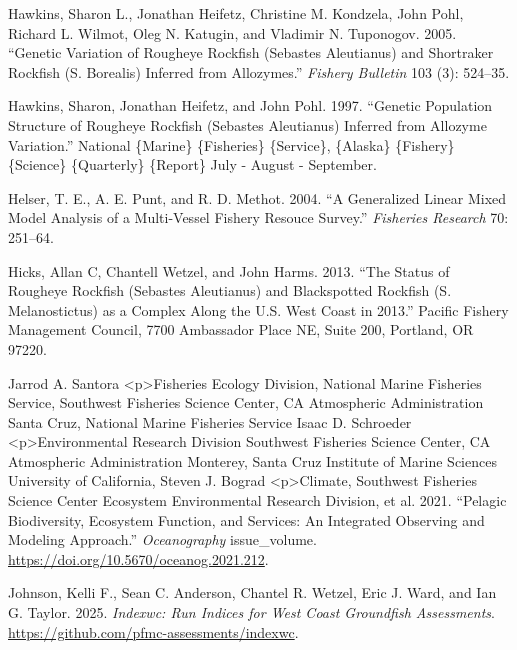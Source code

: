 \documentclass[
]{scrartcl}
\newlength{\cslhangindent}
\newenvironment{CSLReferences}[2] %
 {\begin{list}{}{%
  \setlength{\itemindent}{0pt}
  \setlength{\leftmargin}{0pt}
  \setlength{\parsep}{0pt}
  \ifodd #1
   \setlength{\leftmargin}{\cslhangindent}
   \setlength{\itemindent}{-1\cslhangindent}
  \fi
  \setlength{\itemsep}{#2\baselineskip}}}
 {\end{list}}
\begin{document}
\begin{CSLReferences}{1}{0}
Hawkins, Sharon L., Jonathan Heifetz, Christine M. Kondzela, John Pohl,
Richard L. Wilmot, Oleg N. Katugin, and Vladimir N. Tuponogov. 2005.
{``Genetic Variation of Rougheye Rockfish ({Sebastes} Aleutianus) and
Shortraker Rockfish ({S}. Borealis) Inferred from Allozymes.''}
\emph{Fishery Bulletin} 103 (3): 524--35.

Hawkins, Sharon, Jonathan Heifetz, and John Pohl. 1997. {``Genetic
Population Structure of Rougheye Rockfish ({Sebastes} Aleutianus)
Inferred from Allozyme Variation.''} National \{Marine\} \{Fisheries\}
\{Service\}, \{Alaska\} \{Fishery\} \{Science\} \{Quarterly\} \{Report\}
July - August - September.

Helser, T. E., A. E. Punt, and R. D. Methot. 2004. {``A Generalized
Linear Mixed Model Analysis of a Multi-Vessel Fishery Resouce Survey.''}
\emph{Fisheries Research} 70: 251--64.

Hicks, Allan C, Chantell Wetzel, and John Harms. 2013. {``The Status of
Rougheye Rockfish ({Sebastes} Aleutianus) and Blackspotted Rockfish
({S}. Melanostictus) as a Complex Along the {U}.{S}. {West} {Coast} in
2013.''} Pacific Fishery Management Council, 7700 Ambassador Place NE,
Suite 200, Portland, OR 97220.

Jarrod A. Santora \textbar{} \textless p\textgreater Fisheries Ecology
Division, National Marine Fisheries Service, Southwest Fisheries Science
Center, CA Atmospheric Administration Santa Cruz, National Marine
Fisheries Service Isaac D. Schroeder \textbar{}
\textless p\textgreater Environmental Research Division Southwest
Fisheries Science Center, CA Atmospheric Administration Monterey, Santa
Cruz Institute of Marine Sciences University of California, Steven J.
Bograd \textbar{} \textless p\textgreater Climate, Southwest Fisheries
Science Center Ecosystem Environmental Research Division, et al. 2021.
{``Pelagic Biodiversity, Ecosystem Function, and Services: An Integrated
Observing and Modeling Approach.''} \emph{Oceanography} issue\_volume.
\url{https://doi.org/10.5670/oceanog.2021.212}.

Johnson, Kelli F., Sean C. Anderson, Chantel R. Wetzel, Eric J. Ward,
and Ian G. Taylor. 2025. \emph{Indexwc: Run Indices for West Coast
Groundfish Assessments}.
\url{https://github.com/pfmc-assessments/indexwc}.


\end{CSLReferences}
\end{document}
